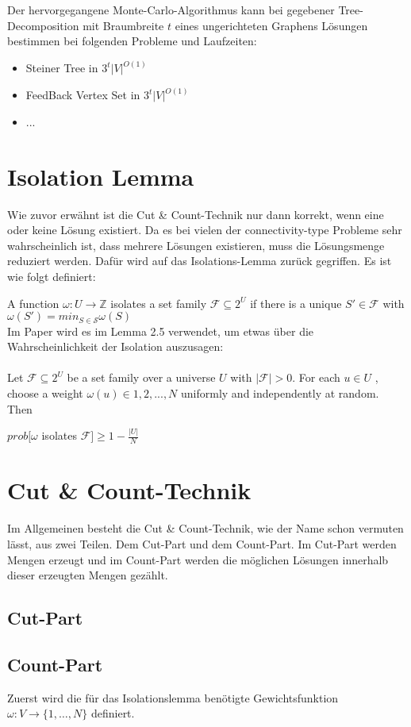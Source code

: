 Der hervorgegangene Monte-Carlo-Algorithmus kann bei gegebener Tree-Decomposition mit Braumbreite $t$ eines ungerichteten Graphens Lösungen bestimmen bei folgenden Probleme und Laufzeiten:
\begin{itemize}
\item Steiner Tree in $3^t |V|^{O(1)}$
\item FeedBack Vertex Set in $3^t|V|^{O(1)}$
\item ...
\end{itemize}

\section{Isolation Lemma}
\label{sec:test}

Wie zuvor erwähnt ist die Cut \& Count-Technik nur dann korrekt, wenn eine oder keine Lösung existiert. Da es bei vielen der connectivity-type Probleme sehr  wahrscheinlich ist, dass mehrere Lösungen existieren, muss die Lösungsmenge reduziert werden. Dafür wird auf das Isolations-Lemma zurück gegriffen. Es ist wie folgt definiert:

A function $\omega : U \rightarrow \mathbb{Z}$ isolates a set family $\mathcal{F} \subseteq 2^U$ if there is a unique $S' \in \mathcal{F}$ with $\omega (S')=min_{S \in \mathcal{S}} \omega(S)$\\

Im Paper wird es im Lemma 2.5 verwendet, um etwas über die Wahrscheinlichkeit der Isolation auszusagen:\\
\\Let $\mathcal{F} \subseteq 2^U$ be a set family over a universe $U$ with $|\mathcal{F}| > 0$. For each $u \in U$ ,
choose a weight $\omega(u) \in {1, 2, . . . , N }$ uniformly and independently at random. Then
\begin{center}
$prob[\omega$ isolates $\mathcal{F}]\geq 1 - \frac{|U|}{N}$
\end{center}

\section{Cut \& Count-Technik}
\label{sec:3}
Im Allgemeinen besteht die Cut \& Count-Technik, wie der Name schon vermuten lässt, aus zwei Teilen. Dem Cut-Part und dem Count-Part.
Im Cut-Part werden Mengen erzeugt und im Count-Part werden die möglichen Lösungen innerhalb dieser erzeugten Mengen gezählt.

\subsection{Cut-Part}

\subsection{Count-Part}
\label{ssec:4}
Zuerst wird die für das Isolationslemma benötigte Gewichtsfunktion $\omega:V\rightarrow \{1,\dots,N\}$ definiert. 

